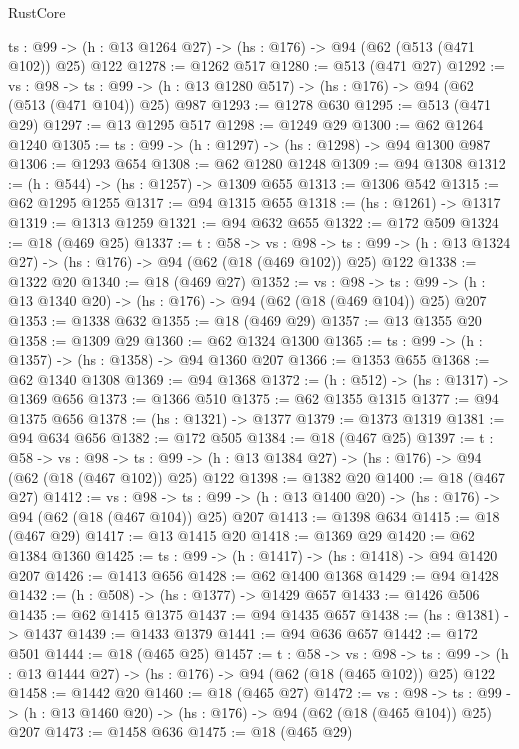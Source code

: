 \begin{lexlean}{RustCore}
\begin{coremodule}
  {ts : @99} -> (h : @13 @1264 @27) -> (hs : @176) -> @94 (@62 (@513 (@471 @102)) @25) @122
@1278 := @1262 @517
@1280 := @513 (@471 @27)
@1292 := {vs : @98} ->
  {ts : @99} -> (h : @13 @1280 @517) -> (hs : @176) -> @94 (@62 (@513 (@471 @104)) @25) @987
@1293 := @1278 @630
@1295 := @513 (@471 @29)
@1297 := @13 @1295 @517
@1298 := @1249 @29
@1300 := @62 @1264 @1240
@1305 := {ts : @99} -> (h : @1297) -> (hs : @1298) -> @94 @1300 @987
@1306 := @1293 @654
@1308 := @62 @1280 @1248
@1309 := @94 @1308
@1312 := (h : @544) -> (hs : @1257) -> @1309 @655
@1313 := @1306 @542
@1315 := @62 @1295 @1255
@1317 := @94 @1315 @655
@1318 := (hs : @1261) -> @1317
@1319 := @1313 @1259
@1321 := @94 @632 @655
@1322 := @172 @509
@1324 := @18 (@469 @25)
@1337 := {t : @58} ->
  {vs : @98} ->
  {ts : @99} -> (h : @13 @1324 @27) -> (hs : @176) -> @94 (@62 (@18 (@469 @102)) @25) @122
@1338 := @1322 @20
@1340 := @18 (@469 @27)
@1352 := {vs : @98} ->
  {ts : @99} -> (h : @13 @1340 @20) -> (hs : @176) -> @94 (@62 (@18 (@469 @104)) @25) @207
@1353 := @1338 @632
@1355 := @18 (@469 @29)
@1357 := @13 @1355 @20
@1358 := @1309 @29
@1360 := @62 @1324 @1300
@1365 := {ts : @99} -> (h : @1357) -> (hs : @1358) -> @94 @1360 @207
@1366 := @1353 @655
@1368 := @62 @1340 @1308
@1369 := @94 @1368
@1372 := (h : @512) -> (hs : @1317) -> @1369 @656
@1373 := @1366 @510
@1375 := @62 @1355 @1315
@1377 := @94 @1375 @656
@1378 := (hs : @1321) -> @1377
@1379 := @1373 @1319
@1381 := @94 @634 @656
@1382 := @172 @505
@1384 := @18 (@467 @25)
@1397 := {t : @58} ->
  {vs : @98} ->
  {ts : @99} -> (h : @13 @1384 @27) -> (hs : @176) -> @94 (@62 (@18 (@467 @102)) @25) @122
@1398 := @1382 @20
@1400 := @18 (@467 @27)
@1412 := {vs : @98} ->
  {ts : @99} -> (h : @13 @1400 @20) -> (hs : @176) -> @94 (@62 (@18 (@467 @104)) @25) @207
@1413 := @1398 @634
@1415 := @18 (@467 @29)
@1417 := @13 @1415 @20
@1418 := @1369 @29
@1420 := @62 @1384 @1360
@1425 := {ts : @99} -> (h : @1417) -> (hs : @1418) -> @94 @1420 @207
@1426 := @1413 @656
@1428 := @62 @1400 @1368
@1429 := @94 @1428
@1432 := (h : @508) -> (hs : @1377) -> @1429 @657
@1433 := @1426 @506
@1435 := @62 @1415 @1375
@1437 := @94 @1435 @657
@1438 := (hs : @1381) -> @1437
@1439 := @1433 @1379
@1441 := @94 @636 @657
@1442 := @172 @501
@1444 := @18 (@465 @25)
@1457 := {t : @58} ->
  {vs : @98} ->
  {ts : @99} -> (h : @13 @1444 @27) -> (hs : @176) -> @94 (@62 (@18 (@465 @102)) @25) @122
@1458 := @1442 @20
@1460 := @18 (@465 @27)
@1472 := {vs : @98} ->
  {ts : @99} -> (h : @13 @1460 @20) -> (hs : @176) -> @94 (@62 (@18 (@465 @104)) @25) @207
@1473 := @1458 @636
@1475 := @18 (@465 @29)

\end{coremodule}
\end{lexlean}

